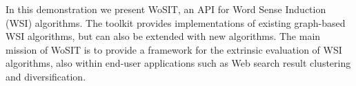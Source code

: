 In this demonstration we present WoSIT, an API for Word Sense Induction (WSI) algorithms. The toolkit provides implementations of existing graph-based WSI algorithms, but can also be extended with new algorithms. The main mission of WoSIT is to provide a framework for the extrinsic evaluation of WSI algorithms, also within end-user applications such as Web search result clustering and diversification.
